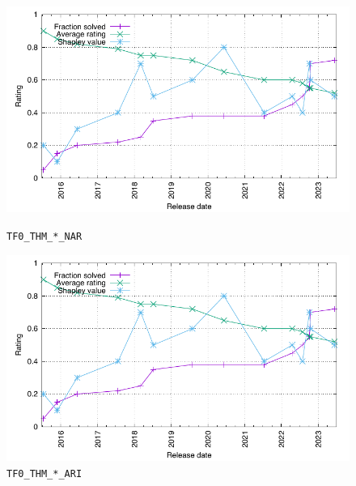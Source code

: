 \documentclass[runningheads]{llncs}
\begin{document}
\begin{figure}[ht!]
\centering
\begin{minipage}[t]{.49\textwidth}
  \centering
  \includegraphics[width=\textwidth]{Plots/GNUPlots/TestData.pdf}
  \vspace*{-2em}
  \caption{{\tt TF0\_THM\_*\_NAR}}
  \label{Plot_TF0_THM_NAR}
\end{minipage}
\begin{minipage}[t]{.49\textwidth}
  \centering
  \includegraphics[width=\textwidth]{Plots/GNUPlots/TestData.pdf}
  \vspace*{-2em}
  \caption{{\tt TF0\_THM\_*\_ARI}}
  \label{Plot_TF0_THM_ARI}
\end{minipage}
\end{figure}
\end{document}
